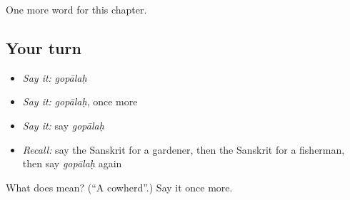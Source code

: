 \begin{grammarlens}[title={What you've built}]
One more word for this chapter.
\end{grammarlens}

\subsection*{Your turn}
\begin{itemize}
\raggedright
  \item \emph{Say it:} \emph{gopālaḥ}
  \item \emph{Say it:} \emph{gopālaḥ}, once more
  \item \emph{Say it:} say \emph{gopālaḥ}
  \item \emph{Recall:} say the Sanskrit for a gardener, then the Sanskrit for a fisherman, then say \emph{gopālaḥ} again
\end{itemize}

\begin{tcolorbox}[breakable,colback=teal!4,colframe=teal!35!black,title={Before you move on}]
What does  mean? (\textquotedblleft{}A cowherd\textquotedblright{}.) Say it once more.
\end{tcolorbox}
